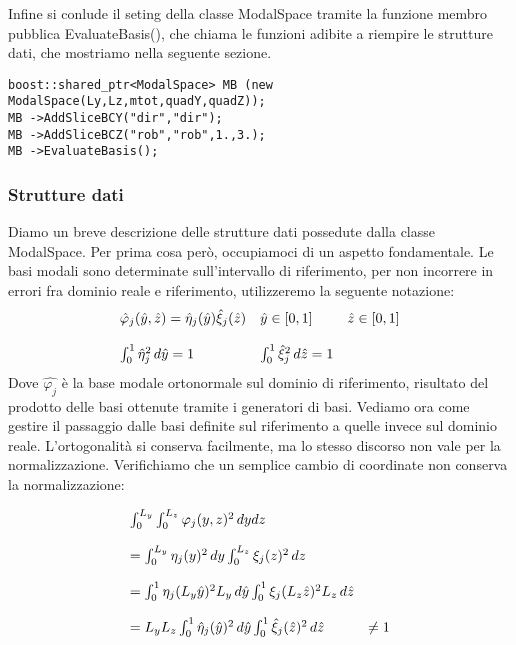 Infine si conlude il seting della classe ModalSpace tramite la funzione membro pubblica EvaluateBasis(), che chiama le funzioni adibite a riempire le strutture dati, che mostriamo nella seguente sezione.

\begin{lstlisting}[style = general]
boost::shared_ptr<ModalSpace> MB (new ModalSpace(Ly,Lz,mtot,quadY,quadZ));
MB ->AddSliceBCY("dir","dir");
MB ->AddSliceBCZ("rob","rob",1.,3.);
MB ->EvaluateBasis();
\end{lstlisting}

\subsubsection{Strutture dati}
Diamo un breve descrizione delle strutture dati possedute dalla classe ModalSpace. Per prima cosa per\`o, occupiamoci di un aspetto fondamentale. Le basi modali sono determinate sull'intervallo di riferimento, per non incorrere in errori fra dominio reale e riferimento,  utilizzeremo la seguente notazione:
\begin{equation}
\label{eq: notazione}
\begin{array}{l l l}
\hat{\varphi}_j(\hat{y},\hat{z}) = \hat{\eta}_j(\hat{y}) \hat{\xi}_j(\hat{z}) & \hat{y} \in [0,1] & \hat{z} \in [0,1] 
\\
\\
\int_0^1 \hat{\eta}^2_j\,d\hat{y} = 1 & \int_0^1 \hat{\xi}^2_j\,d\hat{z} = 1
\end{array}
\end{equation}
Dove $\hat{\varphi_j}$ \`e la base modale ortonormale sul dominio di riferimento, risultato del prodotto delle basi ottenute tramite i generatori di basi.
Vediamo ora come gestire il passaggio dalle basi definite sul riferimento a quelle invece sul dominio reale. L'ortogonalit\`a si conserva facilmente, ma lo stesso discorso non vale per la normalizzazione. Verifichiamo che un semplice cambio di coordinate non conserva la normalizzazione:

\begin{equation}
\label{eq: trasformazione}
\begin{array}{l l }
\int_0^{L_y}\int_0^{L_z} \varphi_j(y,z)^2 \,dydz 
\\
\\
= \int_0^{L_y} \eta_j(y)^2 \,dy\int_0^{L_z} \xi_j(z)^2 \,dz 
\\
\\
= \int_0^{1} \eta_j(L_y\hat{y})^2 L_y\,d\hat{y} \int_0^{1} \xi_j(L_z\hat{z})^2 L_z\,d\hat{z} 
\\
\\
 = L_yL_z\int_0^{1} \hat{\eta}_j(\hat{y})^2 \,d\hat{y} \int_0^{1} \hat{\xi}_j(\hat{z})^2 \,d\hat{z} & \neq  1  
\end{array}
\end{equation}

